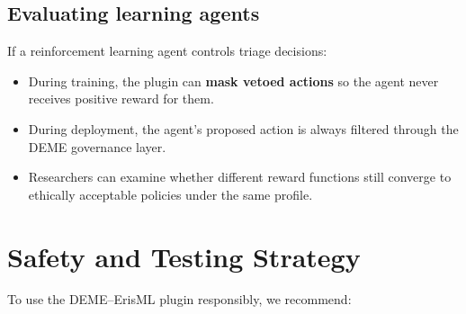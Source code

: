 \documentclass[11pt]{article}
\begin{document}
\subsection{Evaluating learning agents}

If a reinforcement learning agent controls triage decisions:

\begin{itemize}
  \item During training, the plugin can \textbf{mask vetoed actions} so the agent never receives positive reward for them.
  \item During deployment, the agent's proposed action is always filtered through the DEME governance layer.
  \item Researchers can examine whether different reward functions still converge to ethically acceptable policies under the same profile.
\end{itemize}

\section{Safety and Testing Strategy}

To use the DEME--ErisML plugin responsibly, we recommend:
\end{document}
